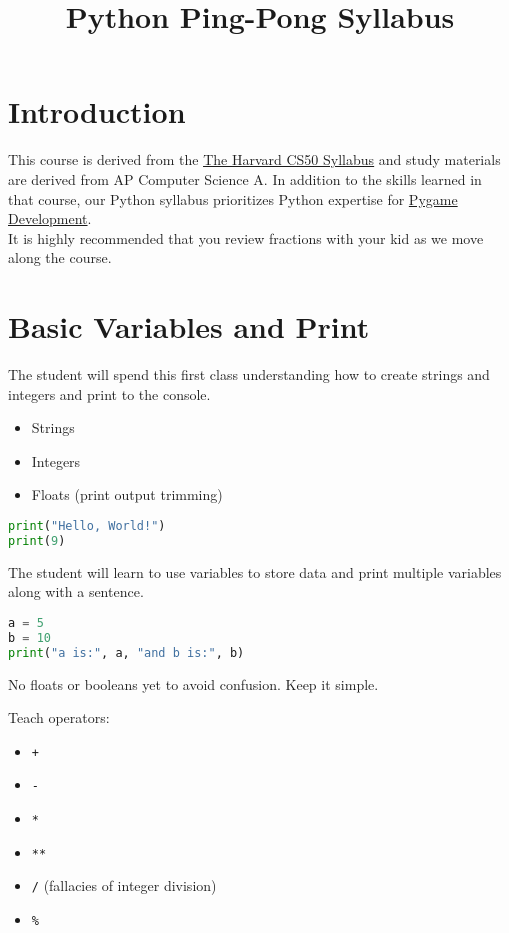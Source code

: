 \documentclass{article}
\title{\vspace{-3em}Python Ping-Pong Syllabus\vspace{-3em}}
\begin{document}
\fontsize{14}{16}\selectfont
\maketitle
\tableofcontents

\section{Introduction}
This course is derived from the \href{https://cs50.harvard.edu/python/2022/syllabus/}{\underline{The Harvard CS50 Syllabus}} and study materials are derived from AP Computer Science A. In addition to the skills learned in that course, our Python syllabus prioritizes Python expertise for \href{https://www.pygame.org/wiki/about}{Pygame Development}. \\

It is highly recommended that you review fractions with your kid as we move along the course.

\section{Basic Variables and Print}
The student will spend this first class understanding how to create strings and integers and print to the console. \\

\begin{itemize}
    \item Strings
    \item Integers
    \item Floats (print output trimming)
\end{itemize}

\begin{lstlisting}[language=Python]
print("Hello, World!")
print(9)
\end{lstlisting}

The student will learn to use variables to store data and print multiple variables along with a sentence.

\begin{lstlisting}[language=Python]
a = 5
b = 10
print("a is:", a, "and b is:", b)
\end{lstlisting}

No floats or booleans yet to avoid confusion. Keep it simple.

Teach operators:
\begin{itemize}
    \item \verb|+|
    \item \verb|-|
    \item \verb|*|
    \item \verb|**|
    \item \verb|/| (fallacies of integer division)
    \item \verb|%|
\end{itemize}
\end{document}

